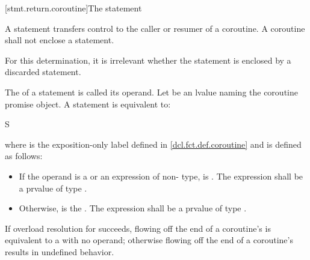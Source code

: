 [stmt.return.coroutine]{The  statement}%
%
%

\begin{bnf}
\br
      \terminal{;}
\end{bnf}

\pnum
A  statement transfers control to
the caller or resumer of a coroutine.
A coroutine shall not enclose
a  statement.
\begin{note}
For this determination, it is irrelevant whether the  statement
is enclosed by a discarded statement.
\end{note}

\pnum
The  of a  statement is
called its operand.
Let  be an lvalue naming the coroutine
promise object.
A  statement is equivalent to:
\begin{ncsimplebnf}
\terminal{\{} S\terminal{;}  \terminal{;} \terminal{\}}
\end{ncsimplebnf}
where  is the exposition-only label
defined in \ref{dcl.fct.def.coroutine}
and  is defined as follows:
\begin{itemize}
\item
If the operand is a  or an expression of non- type,
 is \tcode{)}.
The expression  shall be a prvalue of type .

\item
Otherwise,
 is the  \tcode{\{}{ } \tcode{;} \tcode{;{ }\}}.
The expression 
shall be a prvalue of type .
\end{itemize}

\pnum
If overload resolution for  succeeds,
flowing off the end of a coroutine's 
is equivalent to a  with no operand;
otherwise flowing off the end of a coroutine's 
results in undefined behavior.

